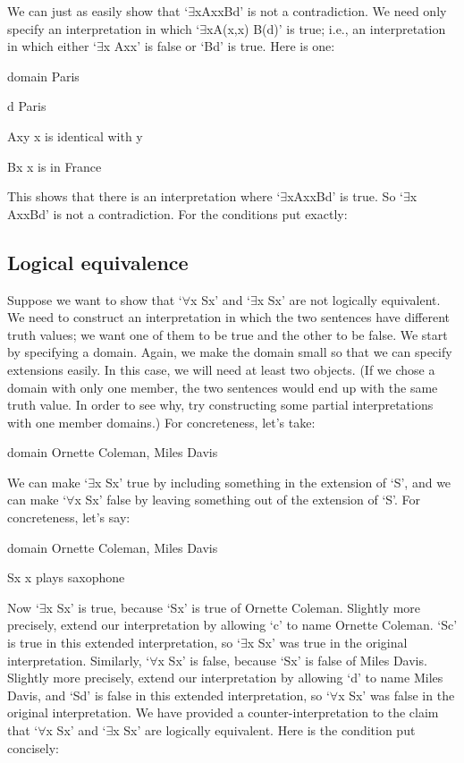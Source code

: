 We can just as easily show that ‘$\exists$xAxx\eif Bd’ is not a contradiction. We need only specify an interpretation in which ‘$\exists$xA(x,x) \eif B(d)’ is true; i.e., an interpretation in which either ‘$\exists$x Axx’ is false or ‘Bd’ is true. Here is one:

\begin{ekey}\item[domain]  Paris
\item[d] Paris
\item[Axy] x is identical with y
\item[Bx] x is in France
\end{ekey}
This shows that there is an interpretation where ‘$\exists$xAxx\eif Bd’ is true. So ‘$\exists$x Axx\eif Bd’ is not a contradiction. For the conditions put exactly:
\subsection{Logical equivalence}

Suppose we want to show that ‘$\forall$x Sx’ and ‘$\exists$x Sx’ are not logically equivalent. We need to construct an interpretation in which the two sentences have different truth values; we want one of them to be true and the other to be false. We start by specifying a domain. Again, we make the domain small so that we can specify extensions easily. In this case, we will need at least two objects. (If we chose a domain with only one member, the two sentences would end up with the same truth value. In order to see why, try constructing some partial interpretations with one member domains.) For concreteness, let’s take:

\begin{ekey}\item[domain]  Ornette Coleman, Miles Davis
\end{ekey}
We can make ‘$\exists$x Sx’ true by including something in the extension of ‘S’, and we can make ‘$\forall$x Sx’ false by leaving something out of the extension of ‘S’. For concreteness, let’s say:

\begin{ekey}\item[domain]  Ornette Coleman, Miles Davis
\item[Sx] x plays saxophone
\end{ekey}
Now ‘$\exists$x Sx’ is true, because ‘Sx’ is true of Ornette Coleman. Slightly more precisely, extend our interpretation by allowing ‘c’ to name Ornette Coleman. ‘Sc’ is true in this extended interpretation, so ‘$\exists$x Sx’ was true in the original interpretation. Similarly, ‘$\forall$x Sx’ is false, because ‘Sx’ is false of Miles Davis. Slightly more precisely, extend our interpretation by allowing ‘d’ to name Miles Davis, and ‘Sd’ is false in this extended interpretation, so ‘$\forall$x Sx’ was false in the original interpretation. We have provided a counter-interpretation to the claim that ‘$\forall$x Sx’ and ‘$\exists$x Sx’ are logically equivalent. Here is the condition put concisely:

